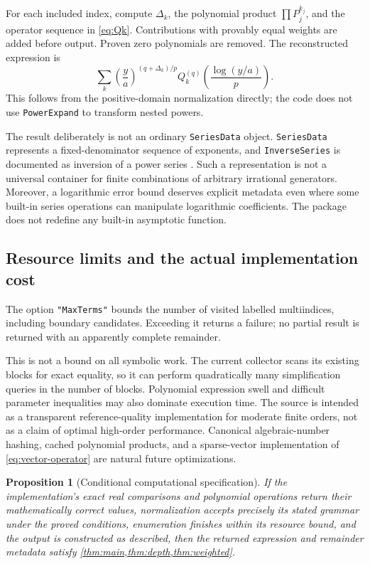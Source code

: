 \documentclass[11pt,a4paper]{article}
\newtheorem{proposition}[theorem]{Proposition}
\theoremstyle{definition}
\theoremstyle{remark}
\newcommand{\code}[1]{\texttt{#1}}
\begin{document}
For each included index, compute $\Delta_k$, the polynomial product
$\prod P_j^{k_j}$, and the operator sequence in \eqref{eq:Qk}. Contributions
with provably equal weights are added before output. Proven zero polynomials
are removed. The reconstructed expression is
\begin{equation}\label{eq:reconstruct}
 \sum_k\left(\frac ya\right)^{(q+\Delta_k)/p}
 Q_k^{(q)}\!\left(\frac{\log(y/a)}p\right).
\end{equation}
This follows from the positive-domain normalization directly; the code does
not use \code{PowerExpand} to transform nested powers.

The result deliberately is not an ordinary \code{SeriesData} object.
\code{SeriesData} represents a fixed-denominator sequence of exponents, and
\code{InverseSeries} is documented as inversion of a power series
\cite{seriesdata,inverseseries}. Such a representation is not a universal
container for finite combinations of arbitrary irrational generators.
Moreover, a logarithmic error bound deserves explicit metadata even where
some built-in series operations can manipulate logarithmic coefficients.
The package does not redefine any built-in asymptotic function.

\subsection{Resource limits and the actual implementation cost}

The option \code{"MaxTerms"} bounds the number of visited labelled
multiindices, including boundary candidates. Exceeding it returns a failure;
no partial result is returned with an apparently complete remainder.

This is not a bound on all symbolic work. The current collector scans its
existing blocks for exact equality, so it can perform quadratically many
simplification queries in the number of blocks. Polynomial expression swell
and difficult parameter inequalities may also dominate execution time. The
source is intended as a transparent reference-quality implementation for
moderate finite orders, not as a claim of optimal high-order performance.
Canonical algebraic-number hashing, cached polynomial products, and a
sparse-vector implementation of \eqref{eq:vector-operator} are natural future
optimizations.

\begin{proposition}[Conditional computational specification]
If the implementation's exact real comparisons and polynomial operations
return their mathematically correct values, normalization accepts precisely
its stated grammar under the proved conditions, enumeration finishes within
its resource bound, and the output is constructed as described, then the
returned expression and remainder metadata satisfy \cref{thm:main,thm:depth,thm:weighted}.
\end{proposition}
\end{document}
